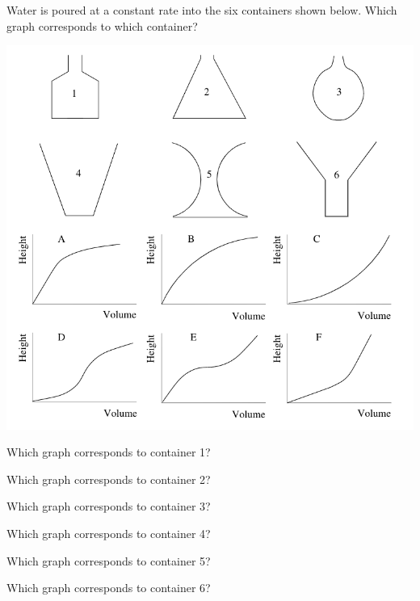 \documentclass{ximera}
\author{Vic Ferdinand, Betsy McNeal, Jenny Sheldon}
\begin{document}
\licenseAPC
\begin{exercise}
Water is poured at a constant rate into the six containers shown
below. Which graph corresponds to which container?


\begin{image}
\includegraphics[width=\textwidth]{GraphicDetails3.png}
\end{image}


Which graph corresponds to container 1?
\begin{multipleChoice}
\end{multipleChoice}


Which graph corresponds to container 2?
\begin{multipleChoice}
\end{multipleChoice}


Which graph corresponds to container 3?
\begin{multipleChoice}
\end{multipleChoice}


Which graph corresponds to container 4?
\begin{multipleChoice}
\end{multipleChoice}


Which graph corresponds to container 5?
\begin{multipleChoice}
\end{multipleChoice}


Which graph corresponds to container 6?
\begin{multipleChoice}
\end{multipleChoice}

\end{exercise}
\end{document}
